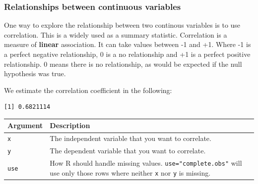\documentclass[]{article}
\newenvironment{Shaded}{\begin{snugshade}}{\end{snugshade}}
\newcommand{\DataTypeTok}[1]{\textcolor[rgb]{0.13,0.29,0.53}{#1}}
\newcommand{\KeywordTok}[1]{\textcolor[rgb]{0.13,0.29,0.53}{\textbf{#1}}}
\newcommand{\NormalTok}[1]{#1}
\newcommand{\OperatorTok}[1]{\textcolor[rgb]{0.81,0.36,0.00}{\textbf{#1}}}
\newcommand{\StringTok}[1]{\textcolor[rgb]{0.31,0.60,0.02}{#1}}
\begin{document}
\hypertarget{relationships-between-continuous-variables}{%
\subsubsection{Relationships between continuous variables}\label{relationships-between-continuous-variables}}

One way to explore the relationship between two continous variables is to use correlation. This is a widely used as a summary statistic. Correlation is a measure of \textbf{linear} association. It can take values between -1 and +1. Where -1 is a perfect negative relationship, 0 is a no relationship and +1 is a perfect positive relationship. 0 means there is no relationship, as would be expected if the null hypothesis was true.

We estimate the correlation coefficient in the following:

\begin{Shaded}
\end{Shaded}

\begin{verbatim}
[1] 0.6821114
\end{verbatim}

\begin{longtable}[]{@{}ll@{}}
\toprule
\begin{minipage}[b]{0.11\columnwidth}\raggedright
Argument\strut
\end{minipage} & \begin{minipage}[b]{0.83\columnwidth}\raggedright
Description\strut
\end{minipage}\tabularnewline
\midrule
\endhead
\begin{minipage}[t]{0.11\columnwidth}\raggedright
\texttt{x}\strut
\end{minipage} & \begin{minipage}[t]{0.83\columnwidth}\raggedright
The independent variable that you want to correlate.\strut
\end{minipage}\tabularnewline
\begin{minipage}[t]{0.11\columnwidth}\raggedright
\texttt{y}\strut
\end{minipage} & \begin{minipage}[t]{0.83\columnwidth}\raggedright
The dependent variable that you want to correlate.\strut
\end{minipage}\tabularnewline
\begin{minipage}[t]{0.11\columnwidth}\raggedright
\texttt{use}\strut
\end{minipage} & \begin{minipage}[t]{0.83\columnwidth}\raggedright
How R should handle missing values. \texttt{use="complete.obs"} will use only those rows where neither \texttt{x} nor \texttt{y} is missing.\strut
\end{minipage}\tabularnewline
\bottomrule
\end{longtable}
\end{document}

